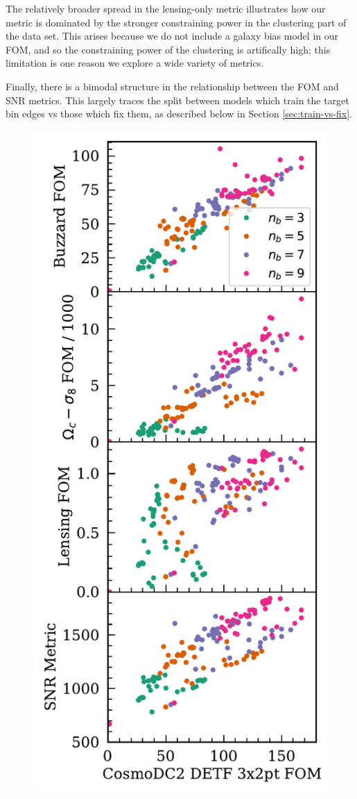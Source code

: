 \documentclass[twocolumn,twocolappendix]{aastex63}
\begin{document}
The relatively broader spread in the lensing-only metric illustrates how our metric is dominated
by the stronger constraining power in the clustering part of the data set.  This arises because
we do not include a galaxy bias model in our FOM, and so the constraining power of the clustering
is artifically high; this limitation is one reason we explore a wide variety of metrics.

Finally, there is a bimodal structure in the relationship between the FOM and SNR metrics.
This largely traces the split between models which train the target bin edges vs those
which fix them, as described below in Section \ref{sec:train-vs-fix}.



\begin{figure}[htbp]
\includegraphics[width=0.9\linewidth]{results/metric_comparisons.pdf}

\end{figure}
\end{document}
